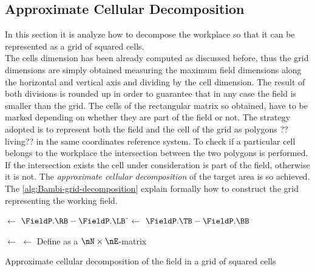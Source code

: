\subsection{Approximate Cellular Decomposition} %
\label{sub:approximate_cellular_decomposition}
In this section it is analyze how to decompose the workplace so that it can be represented as a grid of squared cells.\\
The cells dimension has been already computed as discussed before, thus the grid dimensions are simply obtained measuring the maximum field dimensions along the horizontal and vertical axis and dividing by the cell dimension. The result of both divisions is rounded up in order to guarantee that in any case the field is smaller than the grid. The cells of the rectangular matrix so obtained, have to be marked depending on whether they are part of the field or not. The strategy adopted is to represent both the field and the cell of the grid as polygons ??living?? in the same coordinates reference system. To check if a particular cell belongs to the workplace the intersection between the two polygons is performed. If the intersection exists the cell under consideration is part of the field, otherwise it is not. The \textit{approximate cellular decomposition} of the target area is so achieved. The \autoref{alg:Bambi-grid-decomposition} explain formally how to construct the grid representing the working field.
\begin{algorithm}
	
	\BlankLine
	
	\w $\leftarrow$ $\FieldP.\RB - \FieldP.\LB$ \;
	\h $\leftarrow$ $\FieldP.\TB - \FieldP.\BB$ \;

	\nE $\leftarrow$ \Ceil{$\w / \l$} \;
	\nN $\leftarrow$ \Ceil{$\h / \l$} \;
	Define \Matrix as a $\nN\times\nE$-matrix\;
\caption{Approximate cellular decomposition of the field in a grid of squared cells}
\label{alg:Bambi-grid-decomposition}
\end{algorithm}
